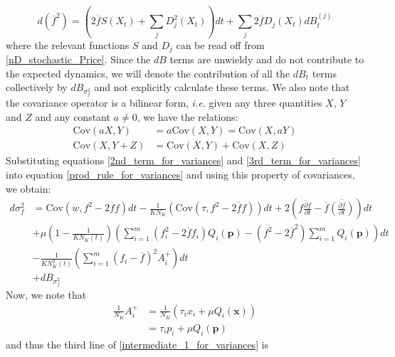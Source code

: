 \begin{equation}
\label{3rd_term_for_variances}
d(\overline{f}^2) = \left(2\overline{f}S(X_t) + \sum\limits_{j}D_j^2(X_t)\right)dt + \sum\limits_{j}2\overline{f}D_j(X_t)dB^{(j)}_t
\end{equation}
where the relevant functions $S$ and $D_j$ can be read off from \eqref{nD_stochastic_Price}. Since the $dB$ terms are unwieldy and do not contribute to the expected dynamics, we will denote the contribution of all the $dB_t$ terms collectively by $dB_{\sigma^2_{f}}$ and not explicitly calculate these terms. We also note that the covariance operator is a bilinear form, \emph{i.e.} given any three quantities $X$, $Y$ and $Z$ and any constant $a \neq 0$, we have the relations:
\begin{align*}
\textrm{Cov}(aX,Y) &= a\textrm{Cov}(X,Y) = \textrm{Cov}(X,aY)\\
\textrm{Cov}(X,Y+Z) &= \textrm{Cov}(X,Y)+\textrm{Cov}(X,Z)
\end{align*}
Substituting equations \eqref{2nd_term_for_variances} and \eqref{3rd_term_for_variances} into equation \eqref{prod_rule_for_variances} and using this property of covariances, we obtain:
\begin{equation}
\label{intermediate_1_for_variances}
\begin{aligned}
d\sigma^2_{f} &= \textrm{Cov}(w,f^2 - 2\overline{f}f)dt - \frac{1}{KN_K}\left(\textrm{Cov}(\tau,f^2 - 2\overline{f}f)\right)dt + 2\left(\overline{f\frac{\partial f}{\partial t}} - \overline{f}\overline{\left(\frac{\partial f}{\partial t}\right)}\right)dt\\
&+ \mu\left(1-\frac{1}{KN_K(t)}\right)\left(\sum\limits_{i=1}^{m}(f^2_i - 2\overline{f}f_i)Q_i(\mathbf{p}) - (\overline{f^2}-2\overline{f}^2)\sum\limits_{i=1}^{m}Q_i(\mathbf{p})\right)dt\\
&- \frac{1}{KN^2_{K}(t)}\left(\sum\limits_{i=1}^{m}(f_i - \overline{f})^2A_i^+\right)dt\\
&+ dB_{\sigma^2_{f}}
\end{aligned}
\end{equation}
Now, we note that
\begin{align}
\frac{1}{N_K}A_i^+ &= \frac{1}{N_K}\left(\tau_ix_i + \mu Q_i(\mathbf{x})\right)\\
&= \tau_ip_i + \mu Q_i(\mathbf{p})
\end{align}
and thus the third line of \eqref{intermediate_1_for_variances} is
